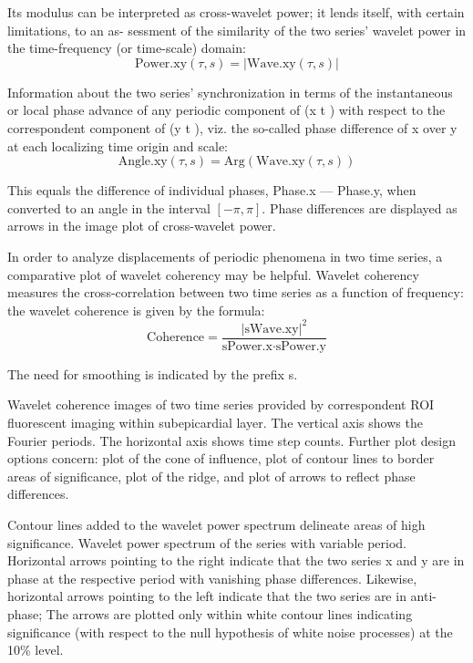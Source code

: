 \documentclass{biophys-new}
\begin{document}
Its modulus can be interpreted as cross-wavelet power; it lends itself, with certain limitations, to an as-
sessment of the similarity of the two series’ wavelet power in the time-frequency (or time-scale) domain:
\begin{equation}\label{eq:power.xy}
\text{Power.xy}(\tau, s)=|\text{Wave.xy}(\tau, s)|
\end{equation}

Information about the two series’ synchronization in terms of the instantaneous or local phase advance of any periodic component of (x t ) with respect to the correspondent component of (y t ), viz. the so-called phase difference of x over y at each localizing time origin and scale:
\begin{equation}\label{eq:angle}
\text{Angle.xy}(\tau, s)=\text{Arg}(\text{Wave.xy}(\tau, s))
\end{equation}

This equals the difference of individual phases, Phase.x --- Phase.y, when converted to an angle in the
interval $[-\pi,\pi]$.
Phase differences are displayed as arrows in the image plot of cross-wavelet power.

In order to analyze displacements of periodic phenomena in two time series, a comparative plot of wavelet coherency may be helpful.
Wavelet coherency  measures the cross-correlation between two time series as a function of frequency: the wavelet coherence is given by the formula:
\begin{equation}\label{eq:coherence}
\text{Coherence}=\frac{|\text{sWave.xy}|^2}{\text{sPower.x}\cdot\text{sPower.y}}
\end{equation}

The need for smoothing is indicated by the prefix s.

Wavelet coherence images of two time series provided by correspondent ROI fluorescent imaging within subepicardial layer.
The vertical axis shows the Fourier periods. The horizontal axis shows time step counts.
Further plot design options concern: plot of the cone of influence, plot of contour lines to border areas of significance, plot of the ridge, and plot of arrows to reflect phase differences.

Contour lines added to the wavelet power spectrum delineate areas of high significance.
Wavelet power spectrum of the series with variable period.
Horizontal arrows pointing to the right indicate that the two series x and y are in phase at the respective period with vanishing phase differences.
Likewise, horizontal arrows pointing to the left indicate that the two series are in anti-phase;
The arrows are plotted only within white contour lines indicating significance (with respect to the null hypothesis of white noise processes) at the 10\% level.
\end{document}
